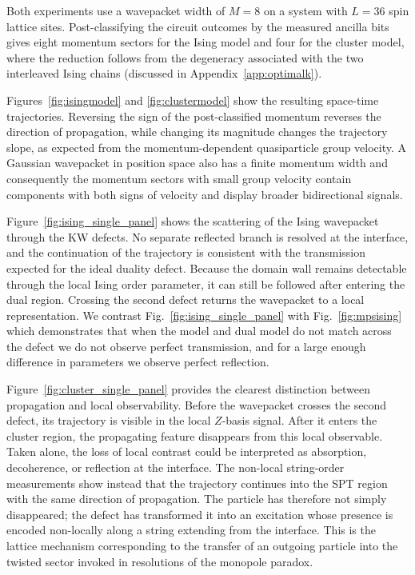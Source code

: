 Both experiments use a wavepacket width of $M=8$ on a system with $L=36$ spin lattice sites. Post-classifying the circuit outcomes by the measured ancilla bits gives eight momentum sectors for the Ising model and four for the cluster model, where the reduction follows from the degeneracy associated with the two interleaved Ising chains (discussed in Appendix~\ref{app:optimalk}).

Figures~\ref{fig:isingmodel} and \ref{fig:clustermodel} show the resulting space-time trajectories. Reversing the sign of the post-classified momentum reverses the direction of propagation, while changing its magnitude changes the trajectory slope, as expected from the momentum-dependent quasiparticle group velocity. A Gaussian wavepacket in position space also has a finite momentum width and consequently the momentum sectors with small group velocity contain components with both signs of velocity and display broader bidirectional signals.

Figure~\ref{fig:ising_single_panel} shows the scattering of the Ising wavepacket through the KW defects.   No separate reflected branch is resolved at the interface, and the continuation of the trajectory is consistent with the transmission expected for the ideal duality defect. Because the domain wall remains detectable through the local Ising order parameter, it can still be followed after entering the dual region. Crossing the second defect returns the wavepacket to a local representation. We contrast Fig.~\ref{fig:ising_single_panel} with Fig.~\ref{fig:mpsising} which demonstrates that when the model and dual model do not match across the defect we do not observe perfect transmission, and for a large enough difference in parameters we observe perfect reflection.

Figure~\ref{fig:cluster_single_panel} provides the clearest distinction between propagation and local observability. Before the wavepacket crosses the second defect, its trajectory is visible in the local $Z$-basis signal. After it enters the cluster region, the propagating feature disappears from this local observable. Taken alone, the loss of local contrast could be interpreted as absorption, decoherence, or reflection at the interface. The non-local string-order measurements show instead that the trajectory continues into the SPT region with the same direction of propagation. The particle has therefore not simply disappeared; the defect has transformed it into an excitation whose presence is encoded non-locally along a string extending from the interface. This is the lattice mechanism corresponding to the transfer of an outgoing particle into the twisted sector invoked in resolutions of the monopole paradox.

